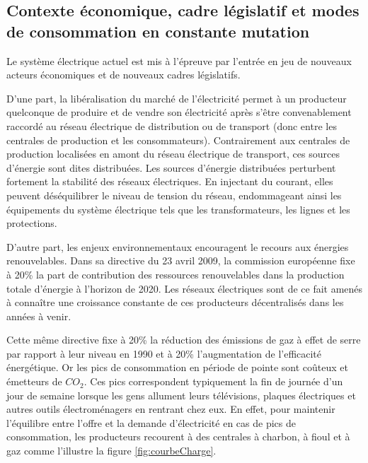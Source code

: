 \subsection{Contexte économique, cadre législatif et modes de con\-sommation en 
constante mutation}

Le système électrique actuel est mis à l'épreuve par l'entrée en jeu de nouveaux 
acteurs économiques et de nouveaux cadres législatifs. 

D'une part, la libéralisation du marché de l'électricité permet à un producteur 
quelconque de produire et de vendre son électricité après s'être convenablement 
raccordé au réseau électrique de distribution ou de transport (donc entre les 
centrales de production et les consommateurs). Contrairement aux centrales de 
production localisées en amont du réseau électrique de transport, ces sources 
d'énergie sont dites distribuées. Les sources d'énergie distribuées perturbent 
fortement la stabilité des réseaux électriques. En injectant du courant, elles 
peuvent déséquilibrer le niveau de tension du réseau, endommageant ainsi les 
équipements du système électrique tels que les transformateurs, les lignes et 
les protections. 

D'autre part, les enjeux environnementaux encouragent le recours aux énergies 
renouvelables. Dans sa directive du 23 avril 2009, la commission européenne fixe 
à 20\% la part de contribution des ressources renouvelables dans la production 
totale d'énergie à l'horizon de 2020. Les réseaux électriques sont de ce fait 
amenés à connaître une croissance constante de ces producteurs décentralisés 
dans les années à venir.

Cette même directive fixe à 20\% la réduction des émissions de gaz à effet de 
serre par rapport à leur niveau en 1990 et à 20\% l'augmentation de l'efficacité 
énergétique. Or les pics de consommation en période de pointe sont coûteux et 
émetteurs de $CO_{2}$. Ces pics correspondent typiquement la fin de journée d'un 
jour de semaine lorsque les gens allument leurs télévisions, plaques électriques 
et autres outils électroménagers en rentrant chez eux.  En effet, pour maintenir 
l'équilibre entre l'offre et la demande d'électricité en cas de pics de 
consommation, les producteurs recourent à des centrales à charbon, à fioul et à 
gaz comme l'illustre la figure \ref{fig:courbeCharge}.


